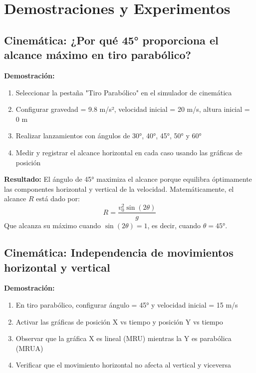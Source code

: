 \section{Demostraciones y Experimentos}

\subsection{Cinemática: ¿Por qué 45° proporciona el alcance máximo en tiro parabólico?}

\textbf{Demostración:}
\begin{enumerate}
    \item Seleccionar la pestaña "Tiro Parabólico" en el simulador de cinemática
    \item Configurar gravedad = 9.8 m/s², velocidad inicial = 20 m/s, altura inicial = 0 m
    \item Realizar lanzamientos con ángulos de 30°, 40°, 45°, 50° y 60°
    \item Medir y registrar el alcance horizontal en cada caso usando las gráficas de posición
\end{enumerate}

\textbf{Resultado:} El ángulo de 45° maximiza el alcance porque equilibra óptimamente las componentes horizontal y vertical de la velocidad. Matemáticamente, el alcance $R$ está dado por:
\begin{equation}
R = \frac{v_0^2 \sin(2\theta)}{g}
\end{equation}
Que alcanza su máximo cuando $\sin(2\theta) = 1$, es decir, cuando $\theta = 45°$.

\subsection{Cinemática: Independencia de movimientos horizontal y vertical}

\textbf{Demostración:}
\begin{enumerate}
    \item En tiro parabólico, configurar ángulo = 45° y velocidad inicial = 15 m/s
    \item Activar las gráficas de posición X vs tiempo y posición Y vs tiempo
    \item Observar que la gráfica X es lineal (MRU) mientras la Y es parabólica (MRUA)
    \item Verificar que el movimiento horizontal no afecta al vertical y viceversa
\end{enumerate}

